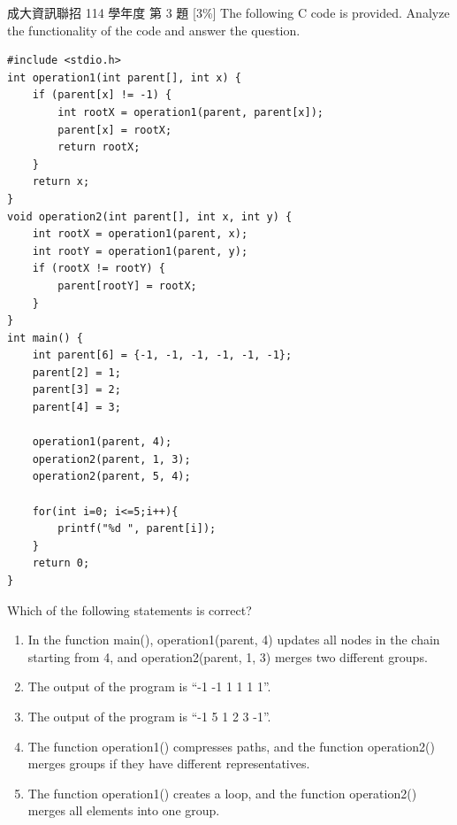 \begin{pastexam}[label={px:ds-2}]{成大資訊聯招 114 學年度 第 3 題}
{[3\%]} The following C code is provided. Analyze the functionality of the code and answer the question.
\begin{verbatim}
#include <stdio.h>
int operation1(int parent[], int x) {
    if (parent[x] != -1) {
        int rootX = operation1(parent, parent[x]);
        parent[x] = rootX;
        return rootX;
    }
    return x;
}
void operation2(int parent[], int x, int y) {
    int rootX = operation1(parent, x);
    int rootY = operation1(parent, y);
    if (rootX != rootY) {
        parent[rootY] = rootX;
    }
}
int main() {
    int parent[6] = {-1, -1, -1, -1, -1, -1};
    parent[2] = 1;
    parent[3] = 2;
    parent[4] = 3;

    operation1(parent, 4);
    operation2(parent, 1, 3);
    operation2(parent, 5, 4);

    for(int i=0; i<=5;i++){
        printf("%d ", parent[i]);
    }
    return 0;
}
\end{verbatim}
Which of the following statements is correct?
\begin{enumerate}[label=(\Alph*)]
\item In the function main(), operation1(parent, 4) updates all nodes in the chain starting from 4, and operation2(parent, 1, 3) merges two different groups.
\item The output of the program is ``-1 -1 1 1 1 1''.
\item The output of the program is ``-1 5 1 2 3 -1''.
\item The function operation1() compresses paths, and the function operation2() merges groups if they have different representatives.
\item The function operation1() creates a loop, and the function operation2() merges all elements into one group.
\end{enumerate}
\end{pastexam}

